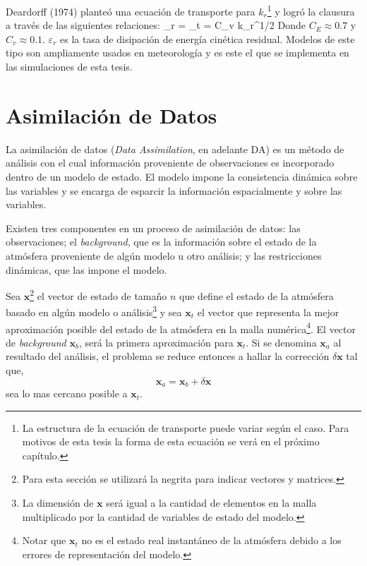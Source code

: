 Deardorff (1974) planteó una ecuación de transporte para $k_r$\footnote{La estructura de la ecuación de transporte puede variar según el caso. Para motivos de esta tesis la forma de esta ecuación se verá en el próximo capítulo.} y logró la clausura a través de las siguientes relaciones:
\be \varepsilon_r =  \ee
\be \nu_t = C_v k_r^{1/2}\Delta \ee
Donde $C_E\approx 0.7$ y $C_v\approx 0.1$. $\varepsilon_r$ es la tasa de disipación de energía cinética residual. Modelos de este tipo son ampliamente usados en meteorología y es este el que se implementa en las simulaciones de esta tesis.
\newpage
\section{Asimilación de Datos}
La asimilación de datos (\emph{Data Assimilation}, en adelante DA) es un método de análisis con el cual información proveniente de observaciones es incorporado dentro de un modelo de estado. El modelo impone la consistencia dinámica sobre las variables y se encarga de esparcir la información espacialmente y sobre las variables.

Existen tres componentes en un proceso de asimilación de datos: las observaciones; el \emph{background}, que es la información sobre el estado de la atmósfera proveniente de algún modelo u otro análisis; y las restricciones dinámicas, que las impone el modelo.

Sea $\mathbf{x}$\footnote{Para esta sección se utilizará la negrita para indicar vectores y matrices.} el vector de estado de tamaño $n$ que define el estado de la atmósfera basado en algún modelo o análisis\footnote{La dimensión de $\mathbf{x}$ será igual a la cantidad de elementos en la malla multiplicado por la cantidad de variables de estado del modelo.} y sea $\mathbf{x}_t$ el vector que representa la mejor aproximación posible del estado de la atmósfera en la malla numérica\footnote{Notar que $\mathbf{x}_t$ no es el estado real instantáneo de la atmósfera debido a los errores de representación del modelo.}. El vector de \emph{background} $\mathbf{x}_b$, será la primera aproximación para $\mathbf{x}_t$. Si se denomina $\mathbf{x}_a$ al resultado del análisis, el problema se reduce entonces a hallar la corrección $\delta \mathbf{x}$ tal que,
\begin{equation*}
	\mathbf{x}_a = \mathbf{x}_b + \delta \mathbf{x}
\end{equation*}
sea lo mas cercano posible a $\mathbf{x}_t$.


